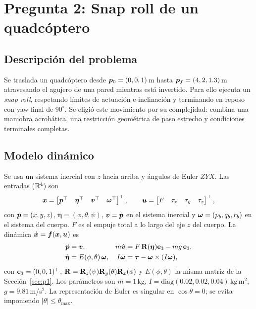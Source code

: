 \section{Pregunta 2: Snap roll de un quadcóptero}
\label{sec:p2}

\subsection{Descripción del problema}
Se traslada un quadcóptero desde $\bm{p}_0=(0,0,1)$\,m hasta $\bm{p}_f=(4,2,1.3)$\,m atravesando el agujero de una pared mientras está invertido. Para ello ejecuta un \textit{snap roll}, respetando límites de actuación e inclinación y terminando en reposo con yaw final de $90^\circ$. Se eligió este movimiento por su complejidad: combina una maniobra acrobática, una restricción geométrica de paso estrecho y condiciones terminales completas.

\subsection{Modelo dinámico}
Se usa un sistema inercial con $z$ hacia arriba y ángulos de Euler $ZYX$. Las entradas ($\mathbb{R}^4$) son
\begin{equation*}
\bm{x}=\begin{bmatrix}\bm{p}^{\top}&\bm{\eta}^{\top}&\bm{v}^{\top}&\bm{\omega}^{\top}\end{bmatrix}^{\top},\qquad
\bm{u}=\begin{bmatrix}F&\tau_x&\tau_y&\tau_z\end{bmatrix}^{\top},
\end{equation*}
con $\bm{p}=(x,y,z)$, $\bm\eta=(\phi,\theta,\psi)$, $\bm{v}=\dot{\bm{p}}$ en el sistema inercial y $\bm{\omega}=(p_b,q_b,r_b)$ en el sistema del cuerpo. $F$ es el empuje total a lo largo del eje $z$ del cuerpo. La dinámica $\dot{\bm{x}}=\bm f(\bm{x},\bm{u})$ es
\begin{align*}
\dot{\bm{p}}&=\bm{v}, & m\dot{\bm{v}}&=F\,\mathbf{R}(\bm\eta)\mathbf e_3-mg\,\mathbf e_3,\\
\dot{\bm\eta}&=E(\phi,\theta)\,\bm{\omega}, & I\dot{\bm{\omega}}&=\bm{\tau}-\bm{\omega}\times(I\bm{\omega}),
\end{align*}
con $\mathbf e_3=(0,0,1)^{\top}$, $\mathbf{R}=\mathbf{R}_z(\psi)\mathbf{R}_y(\theta)\mathbf{R}_x(\phi)$ y $E(\phi,\theta)$ la misma matriz de la Sección~\ref{sec:p1}. Los parámetros son $m=1$\,kg, $I=\mathrm{diag}(0.02,0.02,0.04)$\,kg\,m$^2$, $g=9.81$\,m/s$^2$. La representación de Euler es singular en $\cos\theta=0$; se evita imponiendo $|\theta|\le\theta_{\max}$.

